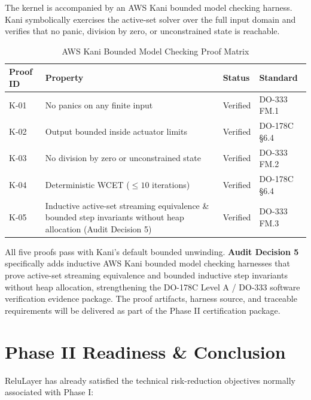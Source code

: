 \documentclass[11pt]{article}
\begin{document}
The kernel is accompanied by an AWS Kani bounded model checking harness. Kani symbolically exercises the active-set solver over the full input domain and verifies that no panic, division by zero, or unconstrained state is reachable.

\begin{table}[htbp]
\centering
\caption{AWS Kani Bounded Model Checking Proof Matrix}
\label{tab:kani}
\begin{tabularx}{\textwidth}{@{}p{1.5cm}X p{1.6cm}p{2.4cm}@{}}
\toprule
\textbf{Proof ID} & \textbf{Property} & \textbf{Status} & \textbf{Standard} \\
\midrule
K-01 & No panics on any finite input & Verified & DO-333 FM.1 \\
K-02 & Output bounded inside actuator limits & Verified & DO-178C \S6.4 \\
K-03 & No division by zero or unconstrained state & Verified & DO-333 FM.2 \\
K-04 & Deterministic WCET ($\le 10$ iterations) & Verified & DO-178C \S6.4 \\
K-05 & Inductive active-set streaming equivalence \& bounded step invariants without heap allocation (Audit Decision 5) & Verified & DO-333 FM.3 \\
\bottomrule
\end{tabularx}
\end{table}

All five proofs pass with Kani's default bounded unwinding. \textbf{Audit Decision 5} specifically adds inductive AWS Kani bounded model checking harnesses that prove active-set streaming equivalence and bounded inductive step invariants without heap allocation, strengthening the DO-178C Level A / DO-333 software verification evidence package. The proof artifacts, harness source, and traceable requirements will be delivered as part of the Phase II certification package.

\section{Phase II Readiness \& Conclusion}
\label{sec:conclusion}

ReluLayer has already satisfied the technical risk-reduction objectives normally associated with Phase I:
\end{document}
